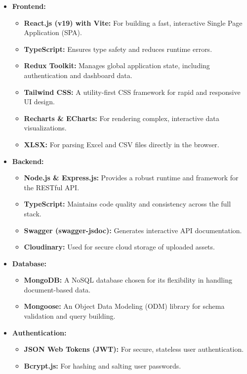 \documentclass[letterpaper,11pt]{report}
\begin{document}
\begin{itemize}
    \item \textbf{Frontend:}
    \begin{itemize}
        \item \textbf{React.js (v19) with Vite:} For building a fast, interactive Single Page Application (SPA).
        \item \textbf{TypeScript:} Ensures type safety and reduces runtime errors.
        \item \textbf{Redux Toolkit:} Manages global application state, including authentication and dashboard data.
        \item \textbf{Tailwind CSS:} A utility-first CSS framework for rapid and responsive UI design.
        \item \textbf{Recharts & ECharts:} For rendering complex, interactive data visualizations.
        \item \textbf{XLSX:} For parsing Excel and CSV files directly in the browser.
    \end{itemize}
    \item \textbf{Backend:}
    \begin{itemize}
        \item \textbf{Node.js & Express.js:} Provides a robust runtime and framework for the RESTful API.
        \item \textbf{TypeScript:} Maintains code quality and consistency across the full stack.
        \item \textbf{Swagger (swagger-jsdoc):} Generates interactive API documentation.
        \item \textbf{Cloudinary:} Used for secure cloud storage of uploaded assets.
    \end{itemize}
    \item \textbf{Database:}
    \begin{itemize}
        \item \textbf{MongoDB:} A NoSQL database chosen for its flexibility in handling document-based data.
        \item \textbf{Mongoose:} An Object Data Modeling (ODM) library for schema validation and query building.
    \end{itemize}
    \item \textbf{Authentication:}
    \begin{itemize}
        \item \textbf{JSON Web Tokens (JWT):} For secure, stateless user authentication.
        \item \textbf{Bcrypt.js:} For hashing and salting user passwords.
    \end{itemize}
\end{itemize}
\end{document}
